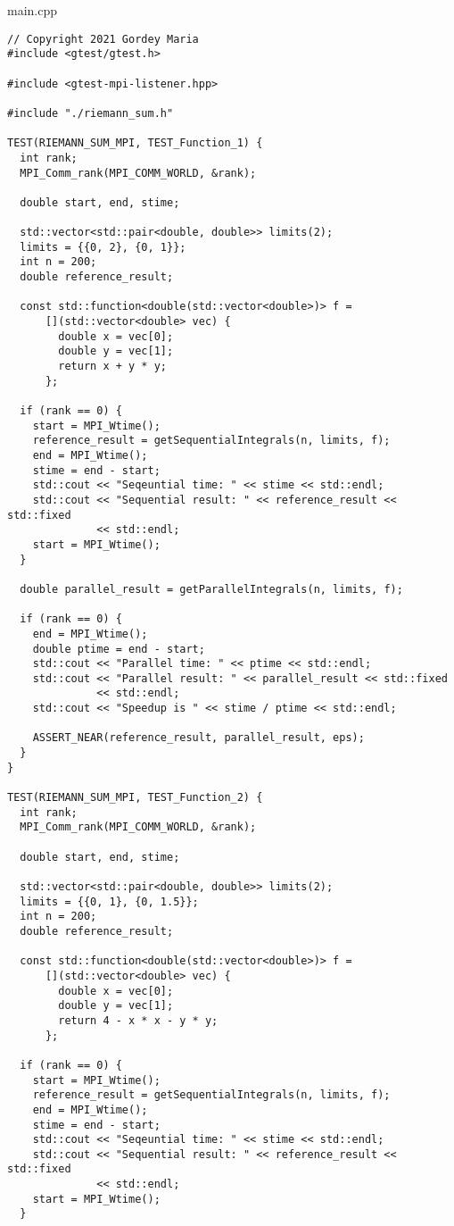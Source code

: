 \documentclass{report}
\begin{document}
main.cpp
\begin{lstlisting}
// Copyright 2021 Gordey Maria
#include <gtest/gtest.h>

#include <gtest-mpi-listener.hpp>

#include "./riemann_sum.h"

TEST(RIEMANN_SUM_MPI, TEST_Function_1) {
  int rank;
  MPI_Comm_rank(MPI_COMM_WORLD, &rank);

  double start, end, stime;

  std::vector<std::pair<double, double>> limits(2);
  limits = {{0, 2}, {0, 1}};
  int n = 200;
  double reference_result;

  const std::function<double(std::vector<double>)> f =
      [](std::vector<double> vec) {
        double x = vec[0];
        double y = vec[1];
        return x + y * y;
      };

  if (rank == 0) {
    start = MPI_Wtime();
    reference_result = getSequentialIntegrals(n, limits, f);
    end = MPI_Wtime();
    stime = end - start;
    std::cout << "Seqeuntial time: " << stime << std::endl;
    std::cout << "Sequential result: " << reference_result << std::fixed
              << std::endl;
    start = MPI_Wtime();
  }

  double parallel_result = getParallelIntegrals(n, limits, f);

  if (rank == 0) {
    end = MPI_Wtime();
    double ptime = end - start;
    std::cout << "Parallel time: " << ptime << std::endl;
    std::cout << "Parallel result: " << parallel_result << std::fixed
              << std::endl;
    std::cout << "Speedup is " << stime / ptime << std::endl;

    ASSERT_NEAR(reference_result, parallel_result, eps);
  }
}

TEST(RIEMANN_SUM_MPI, TEST_Function_2) {
  int rank;
  MPI_Comm_rank(MPI_COMM_WORLD, &rank);

  double start, end, stime;

  std::vector<std::pair<double, double>> limits(2);
  limits = {{0, 1}, {0, 1.5}};
  int n = 200;
  double reference_result;

  const std::function<double(std::vector<double>)> f =
      [](std::vector<double> vec) {
        double x = vec[0];
        double y = vec[1];
        return 4 - x * x - y * y;
      };

  if (rank == 0) {
    start = MPI_Wtime();
    reference_result = getSequentialIntegrals(n, limits, f);
    end = MPI_Wtime();
    stime = end - start;
    std::cout << "Seqeuntial time: " << stime << std::endl;
    std::cout << "Sequential result: " << reference_result << std::fixed
              << std::endl;
    start = MPI_Wtime();
  }


\end{lstlisting}
\end{document}
